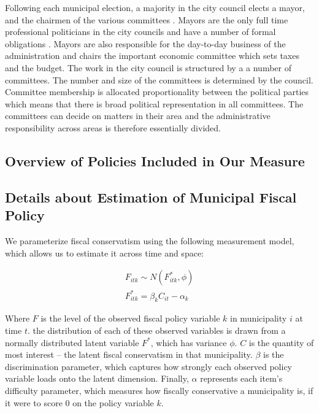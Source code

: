 \documentclass[a4paper,12pt]{article}
\begin{document}
Following each municipal election, a majority in the city council elects a mayor, and the chairmen of the various committees \citep{serritzlew2008explaining}. Mayors are the only full time professional politicians in the city councils and have a number of formal obligations \citep{kjaer2015urban}. Mayors are also responsible for the day-to-day business of the administration and chairs the important economic committee which sets taxes and the budget. The work in the city council is structured by a a number of committees. The number and size of the committees is determined by the council. Committee membership is allocated proportionality between the political parties which means that there is broad political representation in all committees. The committees can decide on matters in their area and the administrative responsibility across areas is therefore essentially divided. 

\clearpage

\subsection{Overview of Policies Included in Our Measure} \label{policy}

%

\clearpage

\subsection{Details about Estimation of Municipal Fiscal Policy} \label{estimation}

We parameterize fiscal conservatism using the following measurement model, which allows us to estimate it across time and space:

\begin{gather*}
F_{itk} \sim N(F^*_{itk}, \phi)\\
F^*_{itk} = \beta_k C_{it} - \alpha_{k}
\end{gather*}

Where $F$ is the level of the observed fiscal policy variable $k$ in municipality $i$ at time $t$. the distribution of each of these observed variables is drawn from a normally distributed latent variable $F^*$, which has variance $\phi$. $C$ is the quantity of most interest -- the latent fiscal conservatism in that municipality. $\beta$ is the discrimination parameter, which captures how strongly each observed policy variable loads onto the latent dimension. Finally, $\alpha$ represents each item's difficulty parameter, which measures how fiscally conservative a municipality is, if it were to score 0 on the policy variable $k$.
\end{document}
